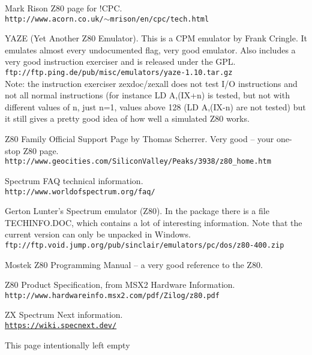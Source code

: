 \documentclass[12pt,twoside,openright,a4paper]{book}
\newcommand{\IntentionallyEmpty}{
	\mbox{}
	\vfill
	\begin{center}
	This page intentionally left empty
	\end{center}
	\vfill
	\mbox{}
}
\begin{document}
\begin{thebibliography}{}

	  Mark Rison Z80 page for !CPC. \\
	{\tt \small http://www.acorn.co.uk/$\sim$mrison/en/cpc/tech.html}

	 YAZE (Yet Another Z80 Emulator). This is a CPM emulator by Frank Cringle. It emulates almost every undocumented flag, very good emulator. Also includes a very good instruction exerciser and is released under the GPL. \\
	{\tt \small ftp://ftp.ping.de/pub/misc/emulators/yaze-1.10.tar.gz} \\
	Note: the instruction exerciser zexdoc/zexall does not test I/O instructions and not all normal instructions (for instance LD A,(IX+n) is tested, but not with different values of n, just n=1, values above 128 (LD A,(IX-n) are not tested) but it still gives a pretty good idea of how well a simulated Z80 works.

	 Z80 Family Official Support Page by Thomas Scherrer. Very good -- your one-stop Z80 page. \\
	{\tt \small http://www.geocities.com/SiliconValley/Peaks/3938/z80\_home.htm}

	 Spectrum FAQ technical information. \\
	{\tt \small http://www.worldofspectrum.org/faq/}

	 Gerton Lunter's Spectrum emulator (Z80). In the package there is a file TECHINFO.DOC, which contains a lot of interesting information. Note that the current version can only be unpacked in Windows. \\
	{\tt \small ftp://ftp.void.jump.org/pub/sinclair/emulators/pc/dos/z80-400.zip}

	 Mostek Z80 Programming Manual -- a very good reference to the Z80.

	 Z80 Product Specification, from MSX2 Hardware Information. \\
	{\tt \small http://www.hardwareinfo.msx2.com/pdf/Zilog/z80.pdf}

	 ZX Spectrum Next information. \\
	{\tt \small \url{https://wiki.specnext.dev/}}

\end{thebibliography}

\pagebreak
\IntentionallyEmpty
\pagebreak
\end{document}
